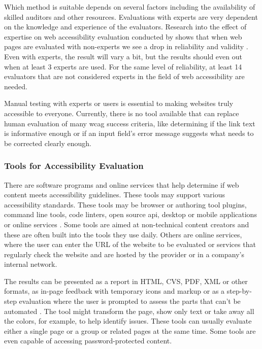 \documentclass{master_thesis}
\begin{document}
Which method is suitable depends on several factors including the availability of skilled auditors and other resources. Evaluations with experts are very dependent on the knowledge and experience of the evaluators. Research into the effect of expertise on web accessibility evaluation conducted by \citeauthor{Brajnik2011} shows that when web pages are evaluated with non-experts we see a drop in reliability and validity \citep{Brajnik2011}. Even with experts, the result will vary a bit, but the results should even out when at least 3 experts are used. For the same level of reliability, at least 14 evaluators that are not considered experts in the field of web accessibility are needed.

Manual testing with experts or users is essential to making websites truly accessible to everyone. Currently, there is no tool available that can replace human evaluation of many \ac{wcag} success criteria, like determining if the link text is informative enough or if an input field's error message suggests what needs to be corrected clearly enough.

\subsubsection{Tools for Accessibility Evaluation}

There are software programs and online services that help determine if web content meets accessibility guidelines. These tools may support various accessibility standards. These tools may be browser or authoring tool plugins, command line tools, code linters, open source \ac{api}, desktop or mobile applications or online services \citep{AbouZahra2017}. Some tools are aimed at non-technical content creators and these are often built into the tools they use daily. Others are online services, where the user can enter the URL of the website to be evaluated or services that regularly check the website and are hosted by the provider or in a company's internal network.

The results can be presented as a report in HTML, CVS, PDF, XML or other formats, as in-page feedback with temporary icons and markup or as a step-by-step evaluation where the user is prompted to assess the parts that can't be automated \citep{AbouZahra2017}. The tool might transform the page, show only text or take away all the colors, for example, to help identify issues. These tools can usually evaluate either a single page or a group or related pages at the same time. Some tools are even capable of accessing password-protected content.
\end{document}
